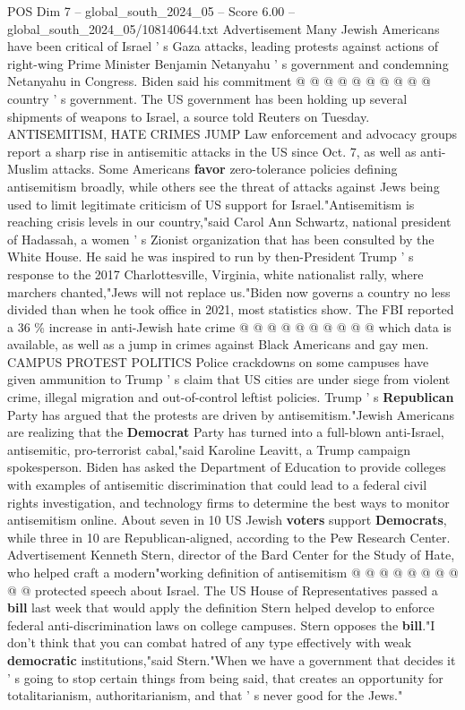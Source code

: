 \begin{textsample}{POS Dim 7 – global\_south\_2024\_05 – Score 6.00 – global\_south\_2024\_05/108140644.txt}
Advertisement Many Jewish Americans have been critical of Israel ' s Gaza attacks, leading protests against actions of right-wing Prime Minister Benjamin Netanyahu ' s government and condemning Netanyahu in Congress.
Biden said his commitment @ @ @ @ @ @ @ @ @ @ country ' s government.
The US government has been holding up several shipments of weapons to Israel, a source told Reuters on Tuesday.
ANTISEMITISM, HATE CRIMES JUMP Law enforcement and advocacy groups report a sharp rise in antisemitic attacks in the US since Oct. 7, as well as anti-Muslim attacks.
Some Americans \textbf{favor} zero-tolerance policies defining antisemitism broadly, while others see the threat of attacks against Jews being used to limit legitimate criticism of US support for Israel."Antisemitism is reaching crisis levels in our country,"said Carol Ann Schwartz, national president of Hadassah, a women ' s Zionist organization that has been consulted by the White House.
He said he was inspired to run by then-President Trump ' s response to the 2017 Charlottesville, Virginia, white nationalist rally, where marchers chanted,"Jews will not replace us."Biden now governs a country no less divided than when he took office in 2021, most statistics show.
The FBI reported a 36 \% increase in anti-Jewish hate crime @ @ @ @ @ @ @ @ @ @ which data is available, as well as a jump in crimes against Black Americans and gay men.
CAMPUS PROTEST POLITICS Police crackdowns on some campuses have given ammunition to Trump ' s claim that US cities are under siege from violent crime, illegal migration and out-of-control leftist policies.
Trump ' s \textbf{Republican} Party has argued that the protests are driven by antisemitism."Jewish Americans are realizing that the \textbf{Democrat} Party has turned into a full-blown anti-Israel, antisemitic, pro-terrorist cabal,"said Karoline Leavitt, a Trump campaign spokesperson.
Biden has asked the Department of Education to provide colleges with examples of antisemitic discrimination that could lead to a federal civil rights investigation, and technology firms to determine the best ways to monitor antisemitism online.
About seven in 10 US Jewish \textbf{voters} support \textbf{Democrats}, while three in 10 are Republican-aligned, according to the Pew Research Center.
Advertisement Kenneth Stern, director of the Bard Center for the Study of Hate, who helped craft a modern"working definition of antisemitism @ @ @ @ @ @ @ @ @ @ protected speech about Israel.
The US House of Representatives passed a \textbf{bill} last week that would apply the definition Stern helped develop to enforce federal anti-discrimination laws on college campuses.
Stern opposes the \textbf{bill}."I don't think that you can combat hatred of any type effectively with weak \textbf{democratic} institutions,"said Stern."When we have a government that decides it ' s going to stop certain things from being said, that creates an opportunity for totalitarianism, authoritarianism, and that ' s never good for the Jews."

\end{textsample}
